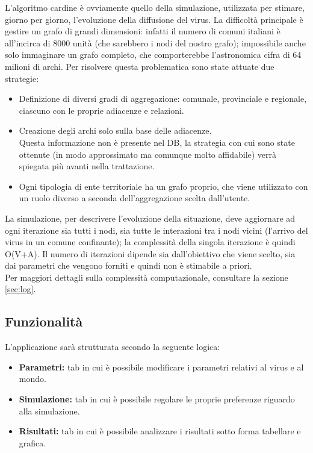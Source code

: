 \documentclass[a4paper, 12pt]{article}
\begin{document}
	L'algoritmo cardine è ovviamente quello della simulazione, utilizzata per stimare, giorno per giorno, l'evoluzione della diffusione del virus.
	La difficoltà principale è gestire un grafo di grandi dimensioni: infatti il numero di comuni italiani è all'incirca di 8000 unità (che sarebbero i nodi del nostro grafo); impossibile anche solo immaginare un grafo completo, che comporterebbe l'astronomica cifra di 64 milioni di archi.
	Per risolvere questa problematica sono state attuate due strategie:
	
	\begin{itemize}
		
		\item Definizione di diversi gradi di aggregazione: comunale, provinciale e regionale, ciascuno con le proprie adiacenze e relazioni.
		
		\item Creazione degli archi solo sulla base delle adiacenze.\\
		Questa informazione non è presente nel DB, la strategia con cui sono state ottenute (in modo approssimato ma comunque molto affidabile) verrà spiegata più avanti nella trattazione.
		
		\item Ogni tipologia di ente territoriale ha un grafo proprio, che viene utilizzato con un ruolo diverso a seconda dell'aggregazione scelta dall'utente.
		
	\end{itemize}
	La simulazione, per descrivere l'evoluzione della situazione, deve aggiornare ad ogni iterazione sia tutti i nodi, sia tutte le interazioni tra i nodi vicini (l'arrivo del virus in un comune confinante); la complessità della singola iterazione è quindi O(V+A).
	Il numero di iterazioni dipende sia dall'obiettivo che viene scelto, sia dai parametri che vengono forniti e quindi non è stimabile a priori.\\
	Per maggiori dettagli sulla complessità computazionale, consultare la sezione \vref{sec:log}.
	
	\subsection{Funzionalità}
	
	L'applicazione sarà strutturata secondo la seguente logica:
	
	\begin{itemize}
	
	\item \textbf{Parametri:} tab in cui è possibile modificare i parametri relativi al virus e al mondo. 
	\item \textbf{Simulazione:} tab in cui è possibile regolare le proprie preferenze riguardo alla simulazione.
	\item \textbf{Risultati:} tab in cui è possibile analizzare i risultati sotto forma tabellare e grafica.
	
	\end{itemize}
\end{document}
